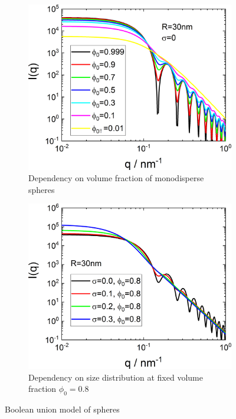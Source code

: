 \begin{figure}[htb]
\begin{subfigure}[b]{.48\textwidth}
   \centering
   \includegraphics[width=1\textwidth]{../images/form_factor/nonparticular/BooleanUnionPhi0.png}
   \caption{Dependency on volume fraction of monodisperse spheres}
   \label{fig:BooleanUnion1}
\end{subfigure}
\hfill
\begin{subfigure}[b]{.48\textwidth}
   \centering
   \includegraphics[width=1\textwidth]{../images/form_factor/nonparticular/BooleanUnionSigma.png}
   \caption{Dependency on size distribution at fixed volume fraction $\phi_0=0.8$}
   \label{fig:BooleanUnion2}
\end{subfigure}
\caption{Boolean union model of spheres}
\label{fig:BooleanUnion}
\end{figure}


